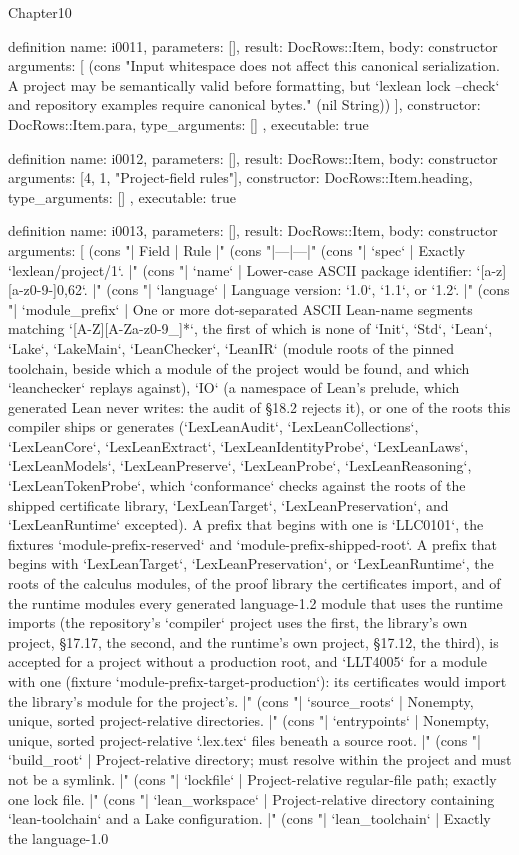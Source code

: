 \begin{lexlean}{Chapter10}
\begin{semanticmodule}
definition{
  name: i0011,
  parameters: [],
  result: DocRows::Item,
  body: constructor{
    arguments: [
      (cons "Input whitespace does not affect this canonical serialization. A project may be semantically valid before formatting, but `lexlean lock --check` and repository examples require canonical bytes." (nil String))
    ],
    constructor: DocRows::Item.para,
    type_arguments: []
  },
  executable: true
}

definition{
  name: i0012,
  parameters: [],
  result: DocRows::Item,
  body: constructor{
    arguments: [4, 1, "Project-field rules"],
    constructor: DocRows::Item.heading,
    type_arguments: []
  },
  executable: true
}

definition{
  name: i0013,
  parameters: [],
  result: DocRows::Item,
  body: constructor{
    arguments: [
      (cons "| Field | Rule |" (cons "|---|---|" (cons "| `spec` | Exactly `lexlean/project/1`. |" (cons "| `name` | Lower-case ASCII package identifier: `[a-z][a-z0-9-]{0,62}`. |" (cons "| `language` | Language version: `1.0`, `1.1`, or `1.2`. |" (cons "| `module_prefix` | One or more dot-separated ASCII Lean-name segments matching `[A-Z][A-Za-z0-9_]*`, the first of which is none of `Init`, `Std`, `Lean`, `Lake`, `LakeMain`, `LeanChecker`, `LeanIR` (module roots of the pinned toolchain, beside which a module of the project would be found, and which `leanchecker` replays against), `IO` (a namespace of Lean's prelude, which generated Lean never writes: the audit of §18.2 rejects it), or one of the roots this compiler ships or generates (`LexLeanAudit`, `LexLeanCollections`, `LexLeanCore`, `LexLeanExtract`, `LexLeanIdentityProbe`, `LexLeanLaws`, `LexLeanModels`, `LexLeanPreserve`, `LexLeanProbe`, `LexLeanReasoning`, `LexLeanTokenProbe`, which `conformance` checks against the roots of the shipped certificate library, `LexLeanTarget`, `LexLeanPreservation`, and `LexLeanRuntime` excepted). A prefix that begins with one is `LLC0101`, the fixtures `module-prefix-reserved` and `module-prefix-shipped-root`. A prefix that begins with `LexLeanTarget`, `LexLeanPreservation`, or `LexLeanRuntime`, the roots of the calculus modules, of the proof library the certificates import, and of the runtime modules every generated language-1.2 module that uses the runtime imports (the repository's `compiler` project uses the first, the library's own project, §17.17, the second, and the runtime's own project, §17.12, the third), is accepted for a project without a production root, and `LLT4005` for a module with one (fixture `module-prefix-target-production`): its certificates would import the library's module for the project's. |" (cons "| `source_roots` | Nonempty, unique, sorted project-relative directories. |" (cons "| `entrypoints` | Nonempty, unique, sorted project-relative `.lex.tex` files beneath a source root. |" (cons "| `build_root` | Project-relative directory; must resolve within the project and must not be a symlink. |" (cons "| `lockfile` | Project-relative regular-file path; exactly one lock file. |" (cons "| `lean_workspace` | Project-relative directory containing `lean-toolchain` and a Lake configuration. |" (cons "| `lean_toolchain` | Exactly the language-1.0 }}
\end{semanticmodule}
\end{lexlean}
